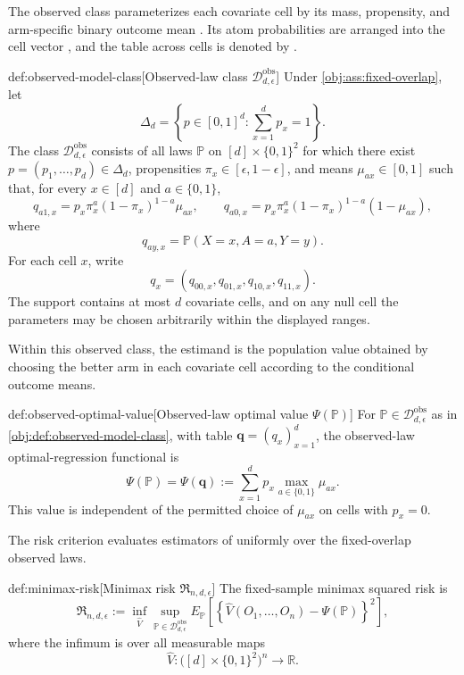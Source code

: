 The observed class parameterizes each covariate cell by its mass, propensity, and arm-specific binary outcome mean . Its atom probabilities  are arranged into the cell vector , and the table across cells is denoted by .

\begin{definitionv}{def:observed-model-class}[Observed-law class \(\mathcal D_{d,\epsilon}^{\mathrm{obs}}\)]
Under \cref{obj:ass:fixed-overlap}, let
\[
\Delta_d=\left\{p\in[0,1]^d:\sum_{x=1}^d p_x=1\right\}.
\]
The class \(\mathcal D_{d,\epsilon}^{\mathrm{obs}}\) consists of all laws \(\mathbb P\) on \([d]\times\{0,1\}^2\) for which there exist \(p=(p_1,\ldots,p_d)\in\Delta_d\), propensities \(\pi_x\in[\epsilon,1-\epsilon]\), and means \(\mu_{ax}\in[0,1]\) such that, for every \(x\in[d]\) and \(a\in\{0,1\}\),
\[
q_{a1,x}
=
p_x\pi_x^a(1-\pi_x)^{1-a}\mu_{ax},
\qquad
q_{a0,x}
=
p_x\pi_x^a(1-\pi_x)^{1-a}(1-\mu_{ax}),
\]
where
\[
q_{ay,x}=\mathbb P(X=x,A=a,Y=y).
\]
For each cell \(x\), write
\[
q_x=(q_{00,x},q_{01,x},q_{10,x},q_{11,x}).
\]
The support contains at most \(d\) covariate cells, and on any null cell the parameters may be chosen arbitrarily within the displayed ranges.
\end{definitionv}

Within this observed class, the estimand is the population value obtained by choosing the better arm in each covariate cell according to the conditional outcome means.

\begin{definitionv}{def:observed-optimal-value}[Observed-law optimal value \(\Psi(\mathbb P)\)]
For \(\mathbb P\in\mathcal D_{d,\epsilon}^{\mathrm{obs}}\) as in \cref{obj:def:observed-model-class}, with table \(\mathbf q=(q_x)_{x=1}^d\), the observed-law optimal-regression functional is
\[
\Psi(\mathbb P)=\Psi(\mathbf q)
:=
\sum_{x=1}^d p_x\max_{a\in\{0,1\}}\mu_{ax}.
\]
This value is independent of the permitted choice of \(\mu_{ax}\) on cells with \(p_x=0\).
\end{definitionv}

The risk criterion evaluates estimators of  uniformly over the fixed-overlap observed laws.

\begin{definitionv}{def:minimax-risk}[Minimax risk \(\mathfrak R_{n,d,\epsilon}\)]
The fixed-sample minimax squared risk is
\[
\mathfrak R_{n,d,\epsilon}
:=
\inf_{\widehat V}
\sup_{\mathbb P\in\mathcal D_{d,\epsilon}^{\mathrm{obs}}}
E_{\mathbb P}
\left[
\left\{
\widehat V(O_1,\ldots,O_n)-\Psi(\mathbb P)
\right\}^2
\right],
\]
where the infimum is over all measurable maps
\[
\widehat V:\bigl([d]\times\{0,1\}^2\bigr)^n\to\mathbb R.
\]
\end{definitionv}

